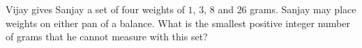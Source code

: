 Vijay gives Sanjay a set of four weights of $1$, $3$, $8$ and $26$ grams. Sanjay may place weights on either pan of a balance. What is the smallest positive integer number of grams that he cannot measure with this set?
